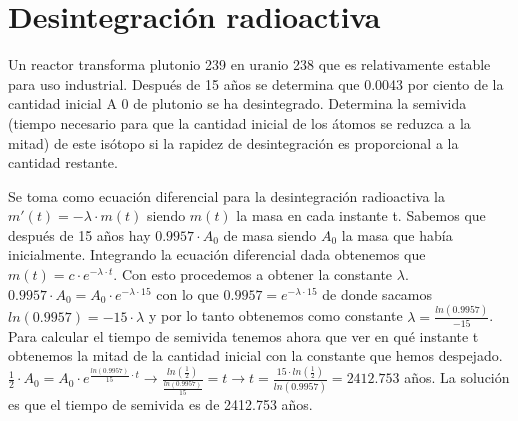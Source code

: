 

\section{Desintegración radioactiva}
\begin{ejer}
	Un reactor transforma plutonio 239 en uranio 238 que es relativamente estable para
	uso industrial. Después de 15 años se determina que 0.0043 por ciento de la cantidad
	inicial A 0 de plutonio se ha desintegrado. Determina la semivida (tiempo necesario
	para que la cantidad inicial de los átomos se reduzca a la mitad) de este isótopo si
	la rapidez de desintegración es proporcional a la cantidad restante.
\end{ejer}
\begin{sol}
	Se toma como ecuación diferencial para la desintegración radioactiva la $m'(t)=-\lambda \cdot m(t)$ siendo $m(t)$ la masa en cada instante t.  
	Sabemos que después de 15 años hay $0.9957 \cdot A_0$ de masa siendo $A_0$ la masa que había inicialmente.  
	Integrando la ecuación diferencial dada obtenemos que $m(t) = c\cdot e^{-\lambda \cdot t}$. Con esto procedemos a obtener la constante $\lambda$.  
	$0.9957\cdot A_0 = A_0\cdot e^{-\lambda \cdot 15}$ con lo que $0.9957 = e^{-\lambda \cdot 15}$ de donde sacamos $ln(0.9957) = -15\cdot \lambda$ y por lo tanto obtenemos como constante $\lambda = \frac{ln(0.9957)}{-15}$.  
	Para calcular el tiempo de semivida tenemos ahora que ver en qué instante t obtenemos la mitad de la cantidad inicial con la constante que hemos despejado.  
	$\frac{1}{2}\cdot A_0 = A_0\cdot e^{\frac{ln(0.9957)}{15}\cdot t} \rightarrow \frac{ln(\frac{1}{2})}{\frac{ln(0.9957)}{15}}=t \rightarrow t = \frac{15\cdot ln(\frac{1}{2})}{ln(0.9957)} = 2412.753$ años.  
	La solución es que el tiempo de semivida es de 2412.753 años.
\end{sol}

